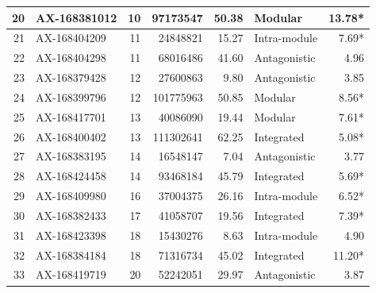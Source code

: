 \begin{refsection}
\begin{table}[ht]
\begin{tabular}{rlrrrlr}
  20 & AX-168381012 &  10 & 97173547 & 50.38 & Modular & 13.78* \\ 
\midrule
  21 & AX-168404209 &  11 & 24848821 & 15.27 & Intra-module & 7.69* \\ 
  22 & AX-168404298 &  11 & 68016486 & 41.60 & Antagonistic & 4.96 \\ 
\midrule
  23 & AX-168379428 &  12 & 27600863 & 9.80 & Antagonistic & 3.85 \\ 
  24 & AX-168399796 &  12 & 101775963 & 50.85 & Modular & 8.56* \\ 
\midrule
  25 & AX-168417701 &  13 & 40086090 & 19.44 & Modular & 7.61* \\ 
  26 & AX-168400402 &  13 & 111302641 & 62.25 & Integrated & 5.08* \\ 
\midrule
  27 & AX-168383195 &  14 & 16548147 & 7.04 & Antagonistic & 3.77 \\ 
  28 & AX-168424458 &  14 & 93468184 & 45.79 & Integrated & 5.69* \\ 
\midrule
  29 & AX-168409980 &  16 & 37004375 & 26.16 & Intra-module & 6.52* \\ 
\midrule
  30 & AX-168382433 &  17 & 41058707 & 19.56 & Integrated & 7.39* \\ 
\midrule
  31 & AX-168423398 &  18 & 15430276 & 8.63 & Intra-module & 4.90 \\ 
  32 & AX-168384184 &  18 & 71316734 & 45.02 & Integrated & 11.20* \\ 
\midrule
  33 & AX-168419719 &  20 & 52242051 & 29.97 & Antagonistic & 3.87 \\ 
   \hline
\end{tabular}
\end{table}


\end{refsection}

